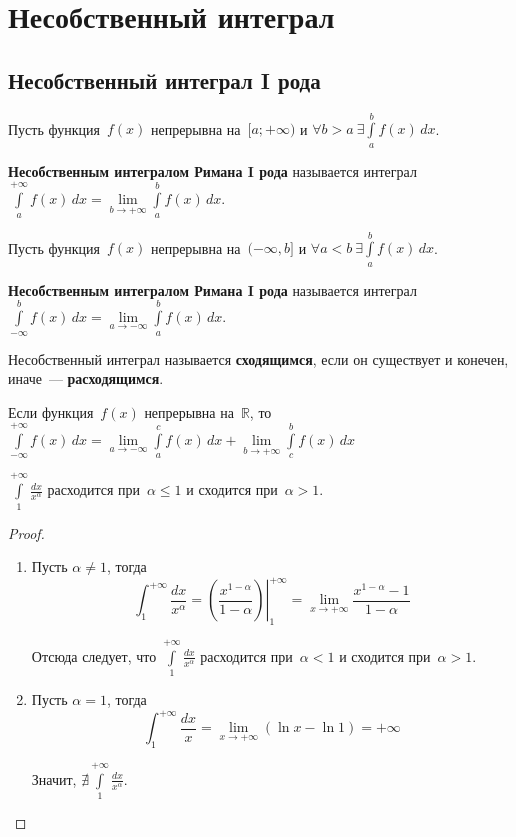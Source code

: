 \section{Несобственный интеграл}

\subsection{Несобственный интеграл I рода}
Пусть функция~$f(x)$ непрерывна на~$[a; +\infty)$ и $\forall b > a \ \exists \int\limits_a^b f(x)\,dx$.

\textbf{Несобственным интегралом Римана I рода} называется интеграл $\int\limits_a^{+\infty} f(x)\,dx = \lim\limits_{b \to +\infty} \int\limits_a^b f(x)\,dx$.

Пусть функция~$f(x)$ непрерывна на~$(-\infty, b]$ и $\forall a < b \ \exists \int\limits_a^b f(x)\,dx$.

\textbf{Несобственным интегралом Римана I рода} называется интеграл $\int\limits_{-\infty}^b f(x)\,dx = \lim\limits_{a \to -\infty} \int\limits_a^b f(x)\,dx$.

Несобственный интеграл называется \textbf{сходящимся}, если он существует и конечен, иначе~--- \textbf{расходящимся}.

Если функция~$f(x)$ непрерывна на~$\mathbb R$, то
$\int\limits_{-\infty}^{+\infty} f(x)\,dx =
\lim\limits_{a \to -\infty} \int\limits_a^c f(x)\,dx + \lim\limits_{b \to +\infty} \int\limits_c^b f(x)\,dx$

\begin{statement}
\label{st:improper_int_1_div_x}
$\int\limits_1^{+\infty} \frac{dx}{x^\alpha}$ расходится при~$\alpha \leqslant 1$ и сходится при~$\alpha > 1$.
\end{statement}
\begin{proof}
\begin{enumerate}
	\item Пусть $\alpha \neq 1$, тогда
	\begin{equation*}
	\int_1^{+\infty} \frac{dx}{x^\alpha} =
	\left.\left( \frac{x^{1-\alpha}}{1 - \alpha} \right)\right|_1^{+\infty} =
	\lim_{x \to +\infty} \frac{x^{1-\alpha} - 1}{1 - \alpha}
	\end{equation*}
	
	Отсюда следует, что $\int\limits_1^{+\infty} \frac{dx}{x^\alpha}$ расходится при~$\alpha < 1$ и сходится при~$\alpha > 1$.
	
	\item Пусть $\alpha = 1$, тогда
	\begin{equation*}
	\int_1^{+\infty} \frac{dx}{x} =
	\lim_{x \to +\infty} (\ln x - \ln 1) = +\infty
	\end{equation*}
	
	Значит, $\nexists \int\limits_1^{+\infty} \frac{dx}{x^\alpha}$.
\end{enumerate}
\end{proof}

